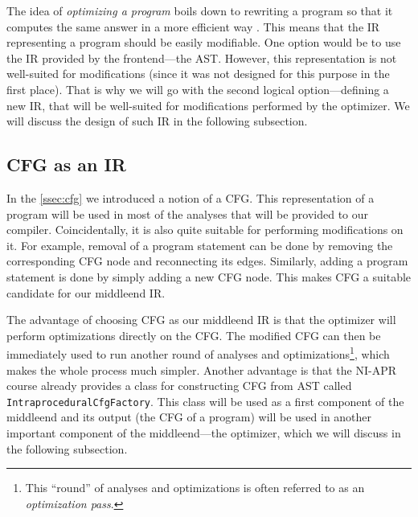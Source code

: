 \documentclass[thesis=M,english]{FITthesis}[2019/12/23]
\begin{document}
The idea of \emph{optimizing a program} boils down to rewriting a program so that it computes the same answer in a more efficient way \cite[Chap. 1.3.2]{eng_comp}. This means that the IR representing a program should be easily modifiable. One option would be to use the IR provided by the frontend---the AST. However, this representation is not well-suited for modifications (since it was not designed for this purpose in the first place). That is why we will go with the second logical option---defining a new IR, that will be well-suited for modifications performed by the optimizer. We will discuss the design of such IR in the following subsection.

\subsection{CFG as an IR}\label{ssec:cfg_as_ir}
In the \autoref{ssec:cfg} we introduced a notion of a CFG. This representation of a program will be used in most of the analyses that will be provided to our compiler. Coincidentally, it is also quite suitable for performing modifications on it. For example, removal of a program statement can be done by removing the corresponding CFG node and reconnecting its edges. Similarly, adding a program statement is done by simply adding a new CFG node. This makes CFG a suitable candidate for our middleend IR.

The advantage of choosing CFG as our middleend IR is that the optimizer will perform optimizations directly on the CFG. The modified CFG can then be immediately used to run another round of analyses and optimizations\footnote{This “round” of analyses and optimizations is often referred to as an \emph{optimization pass}.}, which makes the whole process much simpler. Another advantage is that the NI-APR course already provides a class for constructing CFG from AST called \texttt{IntraproceduralCfgFactory}. This class will be used as a first component of the middleend and its output (the CFG of a program) will be used in another important component of the middleend---the optimizer, which we will discuss in the following subsection.
\end{document}
